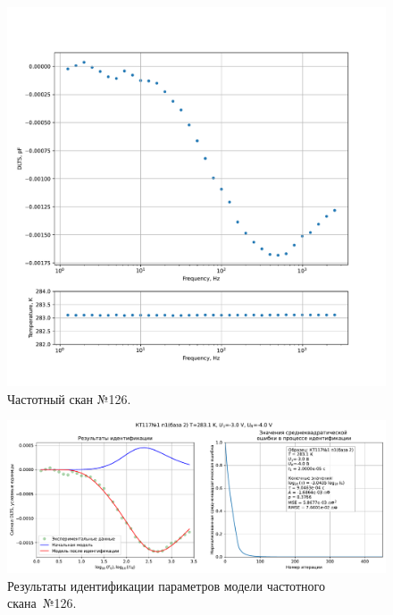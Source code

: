 \begin{figure}[!ht]
    \centering
    \includegraphics[width=1\textwidth]{../plots/КТ117№1_п1(база 2)_2500Гц-1Гц_1пФ_+10С_-3В-4В_20мВ_20мкс_шаг_0,1.pdf}
    \caption{Частотный скан №126.}
    \label{pic:frequency_scan_126}
\end{figure}

\begin{figure}[!ht]
    \centering
    \includegraphics[width=1\textwidth]{../plots/КТ117№1_п1(база 2)_2500Гц-1Гц_1пФ_+10С_-3В-4В_20мВ_20мкс_шаг_0,1_model.pdf}
    \caption{Результаты идентификации параметров модели частотного скана~№126.}
    \label{pic:frequency_scan_model126}
\end{figure}

\pagebreak


